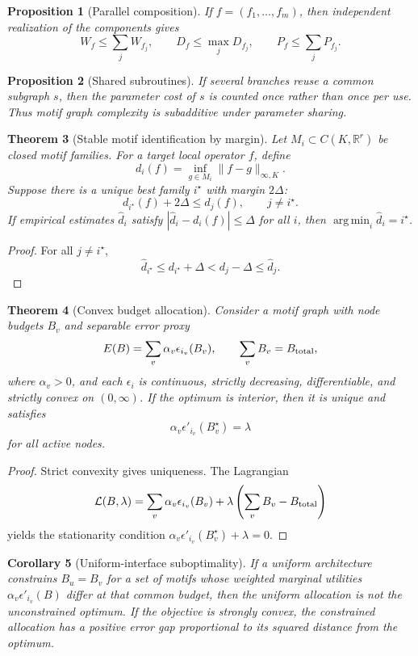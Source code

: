 \documentclass[11pt]{article}
\newtheorem{theorem}{Theorem}[section]
\newtheorem{proposition}[theorem]{Proposition}
\newtheorem{corollary}[theorem]{Corollary}
\theoremstyle{definition}
\newcommand{\R}{\mathbb{R}}
\newcommand{\argmin}{\operatorname*{arg\,min}}
\begin{document}
\begin{proposition}[Parallel composition]
If \(f=(f_1,\ldots,f_m)\), then independent realization of the components gives
\[
W_f\le \sum_j W_{f_j},\qquad D_f\le \max_jD_{f_j},\qquad P_f\le \sum_jP_{f_j}.
\]
\end{proposition}

\begin{proposition}[Shared subroutines]
If several branches reuse a common subgraph \(s\), then the parameter cost of \(s\) is counted once rather than once per use. Thus motif graph complexity is subadditive under parameter sharing.
\end{proposition}

\begin{theorem}[Stable motif identification by margin]
Let \(M_i\subset C(K,\R^r)\) be closed motif families. For a target local operator \(f\), define
\[
  d_i(f)=\inf_{g\in M_i}\|f-g\|_{\infty,K}.
\]
Suppose there is a unique best family \(i^\star\) with margin \(2\Delta\):
\[
  d_{i^\star}(f)+2\Delta\le d_j(f),\qquad j\neq i^\star.
\]
If empirical estimates \(\widehat d_i\) satisfy \(|\widehat d_i-d_i(f)|\le \Delta\) for all \(i\), then \(\argmin_i\widehat d_i=i^\star\).
\end{theorem}

\begin{proof}
For all \(j\neq i^\star\),
\[
\widehat d_{i^\star}\le d_{i^\star}+\Delta < d_j-\Delta\le \widehat d_j.
\]
\end{proof}

\begin{theorem}[Convex budget allocation]
Consider a motif graph with node budgets \(B_v\) and separable error proxy
\[
  E(B)=\sum_v \alpha_v\epsilon_{i_v}(B_v),\qquad \sum_v B_v=B_{\rm total},
\]
where \(\alpha_v>0\), and each \(\epsilon_i\) is continuous, strictly decreasing, differentiable, and strictly convex on \((0,\infty)\). If the optimum is interior, then it is unique and satisfies
\[
  \alpha_v\epsilon'_{i_v}(B_v^\star)=\lambda
\]
for all active nodes.
\end{theorem}

\begin{proof}
Strict convexity gives uniqueness. The Lagrangian
\[
\mathcal L(B,\lambda)=\sum_v\alpha_v\epsilon_{i_v}(B_v)+\lambda\left(\sum_vB_v-B_{\rm total}\right)
\]
yields the stationarity condition \(\alpha_v\epsilon'_{i_v}(B_v^\star)+\lambda=0\).
\end{proof}

\begin{corollary}[Uniform-interface suboptimality]
If a uniform architecture constrains \(B_u=B_v\) for a set of motifs whose weighted marginal utilities \(\alpha_v\epsilon'_{i_v}(B)\) differ at that common budget, then the uniform allocation is not the unconstrained optimum. If the objective is strongly convex, the constrained allocation has a positive error gap proportional to its squared distance from the optimum.
\end{corollary}
\end{document}

